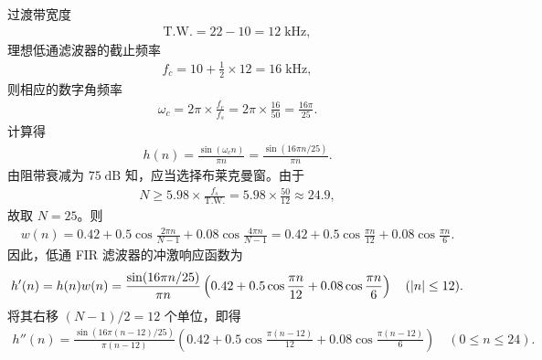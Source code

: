 \begin{solution}
    过渡带宽度
    \begin{align*}
        \text{T.W.} = 22 - 10 = 12\;\mathrm{kHz},
    \end{align*}
    理想低通滤波器的截止频率
    \begin{align*}
        f_c = 10 + \frac{1}{2} \times 12 = 16\;\mathrm{kHz},
    \end{align*}
    则相应的数字角频率
    \begin{align*}
        \omega_c = 2\pi \times \frac{f_c}{f_s} = 2\pi \times \frac{16}{50} = \frac{16\pi}{25}.
    \end{align*}
    计算得
    \begin{align*}
        h(n) = \frac{\sin(\omega_c n)}{\pi n} = \frac{\sin(16\pi n / 25)}{\pi n}.
    \end{align*}
    由阻带衰减为 $75\;\mathrm{dB}$ 知，应当选择布莱克曼窗。由于
    \begin{align*}
        N \ge 5.98 \times \frac{f_s}{\text{T.W.}} = 5.98 \times \frac{50}{12} \approx 24.9,
    \end{align*}
    故取 $N = 25$。则
    \begin{align*}
        w(n) = 0.42 + 0.5\cos\frac{2\pi n}{N - 1} + 0.08\cos\frac{4\pi n}{N - 1} = 0.42 + 0.5\cos\frac{\pi n}{12} + 0.08\cos\frac{\pi n}{6}.
    \end{align*}
    因此，低通 FIR 滤波器的冲激响应函数为
    \begin{align*}
        h'(n) = h(n) w(n) = \frac{\sin(16\pi n / 25)}{\pi n} \left(0.42 + 0.5\cos\frac{\pi n}{12} + 0.08\cos\frac{\pi n}{6}\right) \quad (\left|n\right| \le 12).
    \end{align*}
    将其右移 $(N - 1) / 2 = 12$ 个单位，即得
    \begin{align*}
        h''(n) = \frac{\sin(16\pi (n - 12) / 25)}{\pi (n - 12)} \left(0.42 + 0.5\cos\frac{\pi (n - 12)}{12} + 0.08\cos\frac{\pi (n - 12)}{6}\right) \quad (0 \le n \le 24).
    \end{align*}
\end{solution}

